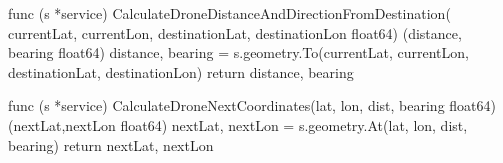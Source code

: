 \begin{python}
    func (s *service) CalculateDroneDistanceAndDirectionFromDestination(
         currentLat, currentLon, destinationLat, destinationLon float64)
    (distance, bearing float64) {
        distance, bearing = s.geometry.To(currentLat,
        currentLon, destinationLat, destinationLon)
        return distance, bearing
    }

    func (s *service) CalculateDroneNextCoordinates(lat, lon,
    dist, bearing float64) (nextLat,nextLon float64) {
        nextLat, nextLon = s.geometry.At(lat, lon, dist, bearing)
        return nextLat, nextLon
    }
\end{python}

